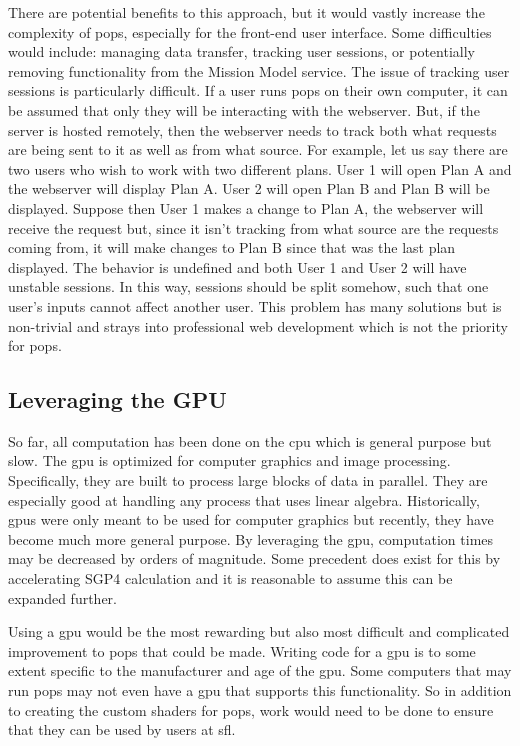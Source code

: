 There are potential benefits to this approach, but it would vastly increase the
complexity of \gls{pops}, especially for the front-end user interface. Some
difficulties would include: managing data transfer, tracking user sessions, or
potentially removing functionality from the Mission Model service. The issue of
tracking user sessions is particularly difficult. If a user runs \gls{pops} on
their own computer, it can be assumed that only they will be interacting with
the webserver. But, if the server is hosted remotely, then the webserver needs
to track both what requests are being sent to it as well as from what source.
For example, let us say there are two users who wish to work with two different
plans. User 1 will open Plan A and the webserver will display Plan A. User 2
will open Plan B and Plan B will be displayed. Suppose then User 1 makes a
change to Plan A, the webserver will receive the request but, since it isn't
tracking from what source are the requests coming from, it will make changes to
Plan B since that was the last plan displayed.  The behavior is undefined and
both User 1 and User 2 will have unstable sessions.  In this way, sessions
should be split somehow, such that one user's inputs cannot affect another
user. This problem has many solutions but is non-trivial and strays into
professional web development which is not the priority for \gls{pops}. 


\subsection{Leveraging the GPU}

So far, all computation has been done on the \gls{cpu} which is general purpose
but slow. The \gls{gpu} is optimized for computer graphics and image
processing. Specifically, they are built to process large blocks of data in
parallel. They are especially good at handling any process that uses linear
algebra. Historically, \glspl{gpu} were only meant to be used for computer
graphics but recently, they have become much more general purpose. By
leveraging the \gls{gpu}, computation times may be decreased by orders of
magnitude. Some precedent does exist for this by accelerating SGP4 calculation
\cite{moeckel_high_2016} \cite{fraire_opencl-accelerated_2013} and it is
reasonable to assume this can be expanded further.

Using a \gls{gpu} would be the most rewarding but also most difficult and
complicated improvement to \gls{pops} that could be made. Writing code for a
\gls{gpu} is to some extent specific to the manufacturer and age of the
\gls{gpu}. Some computers that may run \gls{pops} may not even have a \gls{gpu}
that supports this functionality. So in addition to creating the custom shaders
for \gls{pops}, work would need to be done to ensure that they can be used by
users at \gls{sfl}.
 

